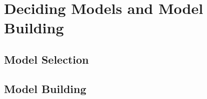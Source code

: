 \chapter{Deciding Models and Model Building}
\label{cha:chapter 3}

\section{Model Selection}
\label{sec:chap3 section 1}

\section{Model Building}
\label{sec:chap3 section 2}
